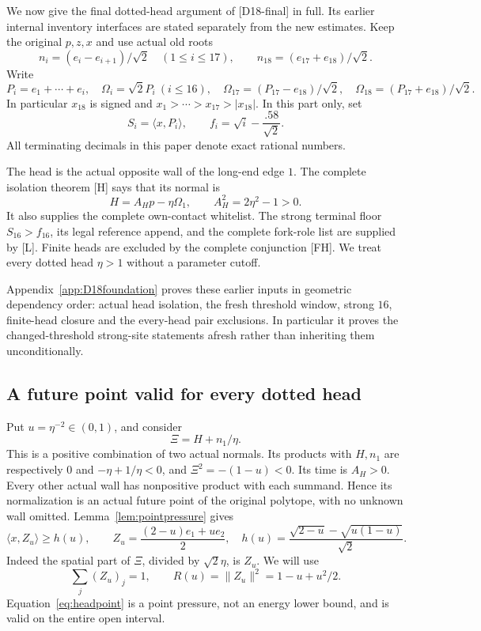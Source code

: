 \documentclass[11pt]{article}
\theoremstyle{definition}
\theoremstyle{remark}
\newcommand{\ip}[2]{\langle #1,#2\rangle}
\newcommand{\norm}[1]{\lVert #1\rVert}
\newcommand{\src}[1]{\textnormal{\textsf{[#1]}}}
\begin{document}
We now give the final dotted-head argument of \src{D18-final}
in full. Its earlier internal inventory interfaces are stated
separately from the new estimates.
Keep the original \(p,z,x\) and use actual old roots
\[
 n_i=(e_i-e_{i+1})/\sqrt2\quad(1\leq i\leq17),\qquad
 n_{18}=(e_{17}+e_{18})/\sqrt2.
\]
Write
\[
 P_i=e_1+\cdots+e_i,\quad
 \Omega_i=\sqrt2P_i\ (i\leq16),\quad
 \Omega_{17}=(P_{17}-e_{18})/\sqrt2,\quad
 \Omega_{18}=(P_{17}+e_{18})/\sqrt2.
\]
In particular \(x_{18}\) is signed and
\(x_1>\cdots>x_{17}>|x_{18}|\). In this part only, set
\begin{equation}
\label{eq:d18floors}
 S_i=\ip{x}{P_i},\qquad f_i=\sqrt i-\frac{.58}{\sqrt2}.
\end{equation}
All terminating decimals in this paper denote exact rational numbers.

The head is the actual opposite wall of the long-end edge \(1\).
The complete isolation theorem \src{H} says that its normal is
\[
 H=A_Hp-\eta\Omega_1,\qquad A_H^2=2\eta^2-1>0.
\]
It also supplies the complete own-contact whitelist.
The strong terminal floor \(S_{16}>f_{16}\), its legal reference
append, and the complete fork-role list are supplied by \src{L}.
Finite heads are excluded by the complete conjunction \src{FH}.
We treat every dotted head \(\eta>1\) without a parameter cutoff.

Appendix~\ref{app:D18foundation} proves these earlier inputs in
geometric dependency order: actual head isolation, the fresh threshold
window, strong \(16\), finite-head closure and the every-head pair
exclusions. In particular it proves the changed-threshold strong-site
statements afresh rather than inheriting them unconditionally.

\subsection{A future point valid for every dotted head}

Put \(u=\eta^{-2}\in(0,1)\), and consider
\[
 \Xi=H+n_1/\eta.
\]
This is a positive combination of two actual normals.
Its products with \(H,n_1\) are respectively \(0\) and
\(-\eta+1/\eta<0\), and \(\Xi^2=-(1-u)<0\).
Its time is \(A_H>0\). Every other actual wall has nonpositive
product with each summand. Hence its normalization is an actual
future point of the original polytope, with no unknown wall
omitted. Lemma~\ref{lem:pointpressure} gives
\begin{equation}
\label{eq:headpoint}
 \ip{x}{Z_u}\geq h(u),\qquad
 Z_u=\frac{(2-u)e_1+u e_2}{2},\quad
 h(u)=\frac{\sqrt{2-u}-\sqrt{u(1-u)}}{\sqrt2}.
\end{equation}
Indeed the spatial part of \(\Xi\), divided by \(\sqrt2\eta\),
is \(Z_u\). We will use
\[
 \sum_j(Z_u)_j=1,\qquad R(u)=\norm{Z_u}^2=1-u+u^2/2.
\]
Equation~\eqref{eq:headpoint} is a point pressure, not an
energy lower bound, and is valid on the entire open interval.
\end{document}
